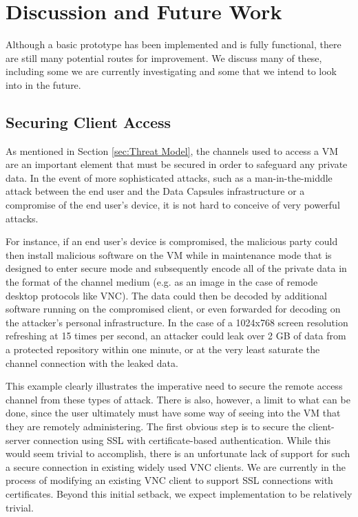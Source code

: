 \documentclass{acm_proc_article-sp}
\begin{document}
\section{Discussion and Future Work}
\label{sec:Discussion}

Although a basic prototype has been implemented and is fully functional, there
are still many potential routes for improvement.  We discuss many of these,
including some we are currently investigating and some that we intend to look
into in the future.

\subsection{Securing Client Access}

As mentioned in Section \ref{sec:Threat Model}, the channels used to access a VM
are an important element that must be secured in order to safeguard any private
data.  In the event of more sophisticated attacks, such as a man-in-the-middle
attack between the end user and the Data Capsules infrastructure or a compromise
of the end user's device, it is not hard to conceive of very powerful attacks.

For instance, if an end user's device is compromised, the malicious party could
then install malicious software on the VM while in maintenance mode that is
designed to enter secure mode and subsequently encode all of the private data in
the format of the channel medium (e.g. as an image in the case of remode desktop
protocols like VNC).  The data could then be decoded by additional software
running on the compromised client, or even forwarded for decoding on the
attacker's personal infrastructure.  In the case of a 1024x768 screen resolution
refreshing at 15 times per second, an attacker could leak over 2 GB of data from
a protected repository within one minute, or at the very least saturate the
channel connection with the leaked data.

This example clearly illustrates the imperative need to secure the remote access
channel from these types of attack.  There is also, however, a limit to what can
be done, since the user ultimately must have some way of seeing into the VM that
they are remotely administering.  The first obvious step is to secure the
client-server connection using SSL with certificate-based authentication.  While
this would seem trivial to accomplish, there is an unfortunate lack of support
for such a secure connection in existing widely used VNC clients.  We are
currently in the process of modifying an existing VNC client to support SSL
connections with certificates.  Beyond this initial setback, we expect
implementation to be relatively trivial.
\end{document}
